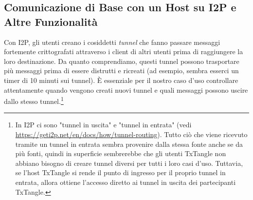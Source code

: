 \subsection{Comunicazione di Base con un Host su I2P e Altre Funzionalità}
\label{subsec:txtangle-host-communication}

Con I2P, gli utenti creano i cosiddetti \emph{tunnel} che fanno passare messaggi fortemente crittografati attraverso i client di altri utenti prima di raggiungere la loro destinazione. Da quanto comprendiamo, questi tunnel possono trasportare più messaggi prima di essere distrutti e ricreati (ad esempio, sembra esserci un timer di 10 minuti sui tunnel). È essenziale per il nostro caso d'uso controllare attentamente quando vengono creati nuovi tunnel e quali messaggi possono uscire dallo stesso tunnel.\footnote{In I2P ci sono "tunnel in uscita" e "tunnel in entrata" (vedi \url{https://geti2p.net/en/docs/how/tunnel-routing}). Tutto ciò che viene ricevuto tramite un tunnel in entrata sembra provenire dalla stessa fonte anche se da più fonti, quindi in superficie sembrerebbe che gli utenti TxTangle non abbiano bisogno di creare tunnel diversi per tutti i loro casi d'uso. Tuttavia, se l'host TxTangle si rende il punto di ingresso per il proprio tunnel in entrata, allora ottiene l'accesso diretto ai tunnel in uscita dei partecipanti TxTangle.}%
